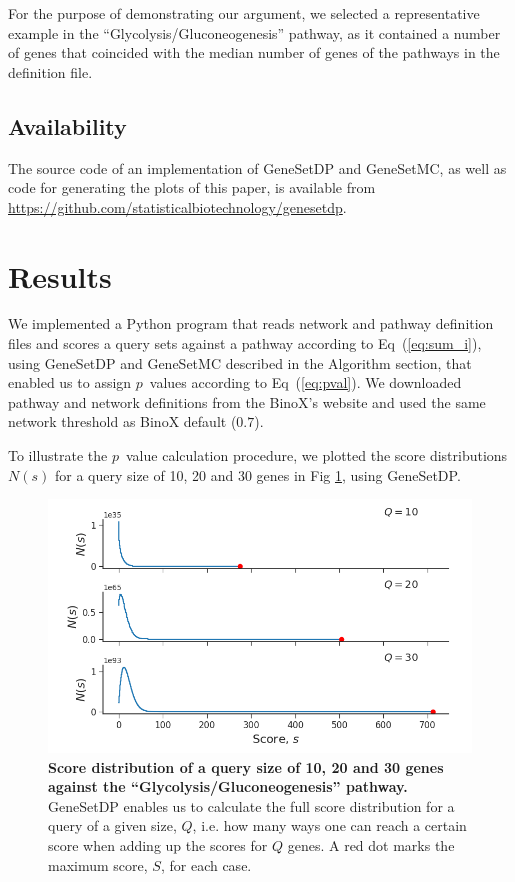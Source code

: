 \documentclass[10pt,letterpaper]{article}
\begin{document}
For the purpose of demonstrating our argument, we selected a representative example in the ``Glycolysis/Gluconeogenesis'' pathway, as it contained a number of genes that coincided with the median number of genes of the pathways in the definition file.

\subsection*{Availability}

The source code of an implementation of GeneSetDP and GeneSetMC, as well as code for generating the plots of this paper, is available from \url{https://github.com/statisticalbiotechnology/genesetdp}.

\section*{Results}

We implemented a Python program that reads network and pathway definition files and scores a query sets against a pathway according to Eq~(\ref{eq:sum_i}), using GeneSetDP and GeneSetMC described in the Algorithm section, that enabled us to assign $p$~values according to Eq~(\ref{eq:pval}). We downloaded pathway and network definitions from the BinoX's website and used the same network threshold as BinoX default ($0.7$).

To illustrate the $p$~value calculation procedure, we plotted the score distributions $N(s)$ for a query size of 10, 20 and 30 genes in Fig \ref{fig:score_dist}, using GeneSetDP.

\begin{figure}[htb]
	\begin{center}
		\includegraphics[width=.9\textwidth]{figures/score_distribuition_multiple.png}
    \end{center}
  \caption{{\bf Score distribution of a query size of 10, 20 and 30 genes against the ``Glycolysis/Gluconeogenesis'' pathway.} GeneSetDP enables us to calculate the full score distribution for a query of a given size, $Q$, i.e. how many ways one can reach a certain score when adding up the scores for $Q$ genes. A red dot marks the maximum score, $S$, for each case.}
  \label{fig:score_dist}
\end{figure}
\end{document}
